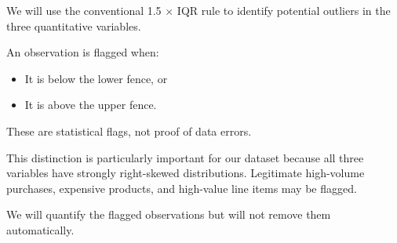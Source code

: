 \documentclass[11pt]{article}
\providecommand{\tightlist}{%
      \setlength{\itemsep}{0pt}\setlength{\parskip}{0pt}}
\begin{document}
We will use the conventional 1.5 × IQR rule to identify potential
outliers in the three quantitative variables.

An observation is flagged when:

\begin{itemize}
\tightlist
\item
  It is below the lower fence, or
\item
  It is above the upper fence.
\end{itemize}

These are statistical flags, not proof of data errors.

This distinction is particularly important for our dataset because all
three variables have strongly right-skewed distributions. Legitimate
high-volume purchases, expensive products, and high-value line items may
be flagged.

We will quantify the flagged observations but will not remove them
automatically.
\end{document}
